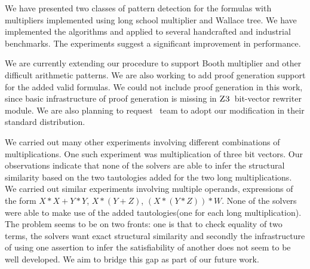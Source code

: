 We have presented two classes of pattern detection for the formulas with
multipliers implemented using long school multiplier and Wallace tree.
%
We have implemented the algorithms and applied to several handcrafted and 
industrial benchmarks.
%
The experiments suggest a significant improvement in performance.

We are currently extending our procedure to support Booth multiplier
and other difficult arithmetic patterns.
%
We are also working to add proof generation support
for the added valid formulas.
%
We could not include proof generation in this work, since basic infrastructure
of proof generation is missing in $\textsc{Z3}$~bit-vector rewriter module.
%
We are also planning to request \zthree~team to adopt our modification in their
standard distribution.


We carried out many other experiments involving different combinations of multiplications. One such experiment was multiplication of three bit vectors. Our observations indicate that none of the solvers are able to infer the structural similarity based on the two tautologies added for the two long multiplications. We carried out similar experiments involving multiple operands, expressions of the form $X*X + Y*Y$, $X*(Y+Z)$, $(X*(Y*Z))*W$. None of the solvers were able to make use of the added tautologies(one for each long multiplication). The problem seems to be on two fronts: one is that to check equality of two terms, the solvers want exact structural similarity and secondly the infrastructure of using one assertion to infer the satisfiability of another does not seem to be well developed. We aim to bridge this gap as part of our future work.




